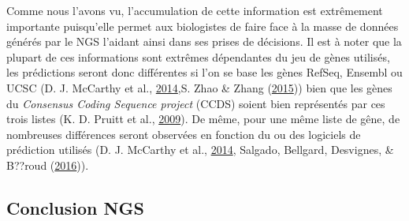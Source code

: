 \documentclass[12pt,twoside]{reedthesis}
\theoremstyle{definition}
\theoremstyle{definition}
\theoremstyle{remark}
\begin{document}
  Comme nous l'avons vu, l'accumulation de cette information est
  extrêmement importante puisqu'elle permet aux biologistes de faire face
  à la masse de données générés par le NGS l'aidant ainsi dans ses prises
  de décisions. Il est à noter que la plupart de ces informations sont
  extrêmes dépendantes du jeu de gènes utilisés, les prédictions seront
  donc différentes si l'on se base les gènes RefSeq, Ensembl ou UCSC (D.
  J. McCarthy et al., \protect\hyperlink{ref-McCarthy2014}{2014},S. Zhao
  \& Zhang (\protect\hyperlink{ref-Zhao2015}{2015})) bien que les gènes du
  \emph{Consensus Coding Sequence project} (CCDS) soient bien représentés
  par ces trois listes (K. D. Pruitt et al.,
  \protect\hyperlink{ref-Pruitt2009}{2009}). De même, pour une même liste
  de gêne, de nombreuses différences seront observées en fonction du ou
  des logiciels de prédiction utilisés (D. J. McCarthy et al.,
  \protect\hyperlink{ref-McCarthy2014}{2014}, Salgado, Bellgard,
  Desvignes, \& B??roud (\protect\hyperlink{ref-Salgado2016}{2016})).
  
  \subsection{Conclusion NGS}\label{conclusion-ngs}
  
\end{document}
